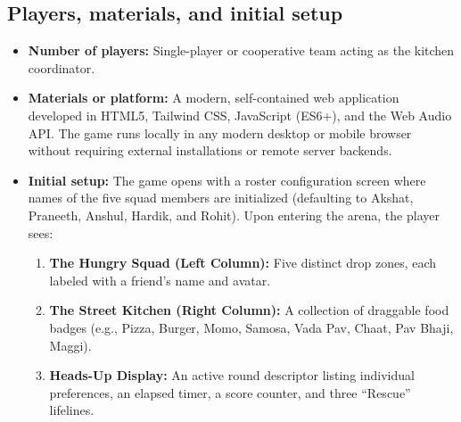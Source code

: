 \documentclass[11pt,a4paper]{article}
\begin{document}
\subsection{Players, materials, and initial setup}
\begin{itemize}
  \item \textbf{Number of players:} Single-player or cooperative team acting as the kitchen coordinator.
  \item \textbf{Materials or platform:} A modern, self-contained web application developed in HTML5, Tailwind CSS, JavaScript (ES6+), and the Web Audio API. The game runs locally in any modern desktop or mobile browser without requiring external installations or remote server backends.
  \item \textbf{Initial setup:} The game opens with a roster configuration screen where names of the five squad members are initialized (defaulting to Akshat, Praneeth, Anshul, Hardik, and Rohit). Upon entering the arena, the player sees:
  \begin{enumerate}
    \item \textbf{The Hungry Squad (Left Column):} Five distinct drop zones, each labeled with a friend's name and avatar.
    \item \textbf{The Street Kitchen (Right Column):} A collection of draggable food badges (e.g., Pizza, Burger, Momo, Samosa, Vada Pav, Chaat, Pav Bhaji, Maggi).
    \item \textbf{Heads-Up Display:} An active round descriptor listing individual preferences, an elapsed timer, a score counter, and three ``Rescue'' lifelines.
  \end{enumerate}
\end{itemize}
\end{document}

